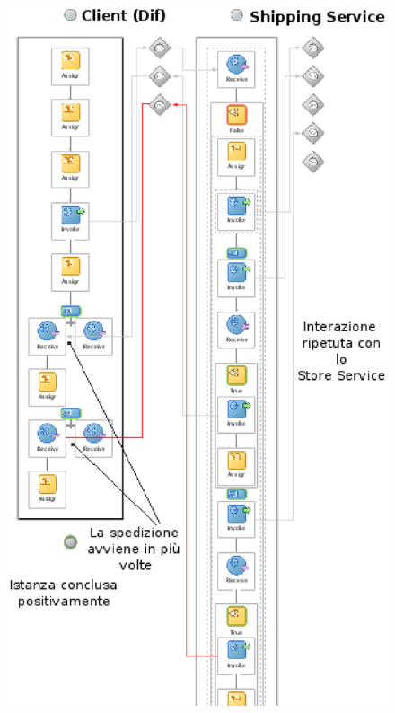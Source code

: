 \begin{figure}[p]
\begin{center}
  \includegraphics[scale=1,clip]{blide/dia/Sim3}
   \caption[]{}
  \label{fig:Sim3}
\end{center}
\end{figure}



